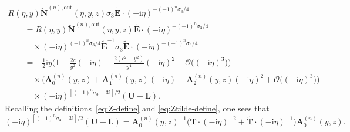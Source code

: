 \begin{gather*}
R(\eta,y)\breve{\mathbf{N}}^{(n),\mathrm{out}}(\eta,y,z)\sigma_3\widetilde{\mathbf{E}}\cdot(-\mathrm{i}\eta)^{-(-1)^n\sigma_3/4}\\
\qquad {} =
R(\eta,y)\breve{\mathbf{N}}^{(n),\mathrm{out}}(\eta,y,z)\widetilde{\mathbf{E}}\cdot(-\mathrm{i}\eta)^{-(-1)^n\sigma_3/4}\\
 \qquad\quad{}\times
(-\mathrm{i}\eta)^{(-1)^n\sigma_3/4}\widetilde{\mathbf{E}}^{-1}\sigma_3\widetilde{\mathbf{E}}\cdot(-\mathrm{i}\eta)^{-(-1)^n\sigma_3/4}\\
\qquad{} =-\tfrac{1}{2}\mathrm{i} y \Big(1-\tfrac{2c}{y^2}(-\mathrm{i}\eta) -\tfrac{2(c^2+y^2)}{y^4}(-\mathrm{i}\eta)^2+\mathcal{O}\bigl((-\mathrm{i}\eta)^3\bigr)\Big)\\
 \qquad\quad{}\times\bigl(\mathbf{A}_0^{(n)}(y,z) + \mathbf{A}_1^{(n)}(y,z)(-\mathrm{i}\eta) + \mathbf{A}_2^{(n)}(y,z)(-\mathrm{i}\eta)^2 + \mathcal{O}\bigl((-\mathrm{i}\eta)^3\bigr)\bigr)\\
 \qquad\quad{}\times
(-\mathrm{i}\eta)^{[(-1)^n\sigma_3-3\mathbb{I}]/2}(\mathbf{U}+\mathbf{L}).
\end{gather*}
Recalling the definitions~\eqref{eq:Z-define} and \eqref{eq:Ztilde-define},
one sees that \[
(-\mathrm{i}\eta)^{[(-1)^n\sigma_3-3\mathbb{I}]/2}(\mathbf{U}+\mathbf{L})=\mathbf{A}_0^{(n)}(y,z)^{-1}\bigl(\mathbf{T}\cdot(-\mathrm{i}\eta)^{-2} +\widetilde{\mathbf{T}}\cdot(-\mathrm{i}\eta)^{-1}\bigr)\mathbf{A}_0^{(n)}(y,z).
\]
\pagebreak

